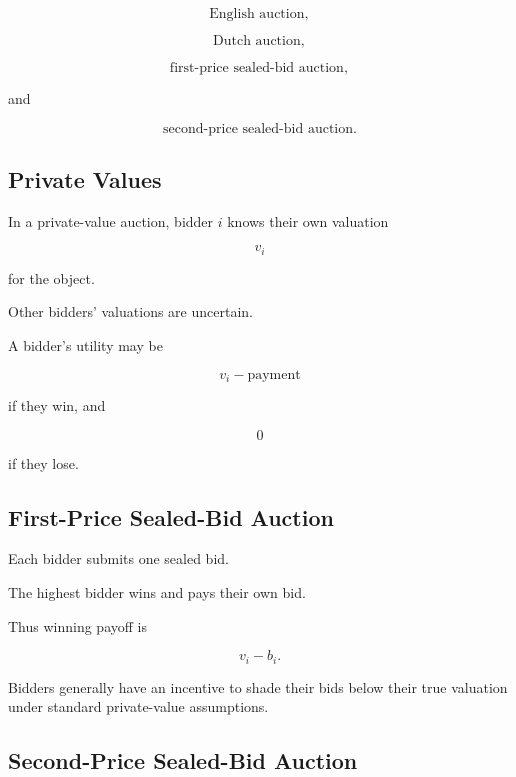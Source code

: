 \[
\boxed{
\text{English auction},
}
\]

\[
\boxed{
\text{Dutch auction},
}
\]

\[
\boxed{
\text{first-price sealed-bid auction},
}
\]

and

\[
\boxed{
\text{second-price sealed-bid auction}.
}
\]

\subsection{Private Values}
\label{subsec:private-value-auctions}

In a private-value auction, bidder \(i\) knows their own valuation

\[
\boxed{
v_i
}
\]

for the object.

Other bidders' valuations are uncertain.

A bidder's utility may be

\[
\boxed{
v_i-\text{payment}
}
\]

if they win, and

\[
\boxed{
0
}
\]

if they lose.

\subsection{First-Price Sealed-Bid Auction}
\label{subsec:first-price-auction}

Each bidder submits one sealed bid.

The highest bidder wins and pays their own bid.

Thus winning payoff is

\[
\boxed{
v_i-b_i.
}
\]

Bidders generally have an incentive to shade their bids below their true
valuation under standard private-value assumptions.

\subsection{Second-Price Sealed-Bid Auction}
\label{subsec:second-price-auction}

